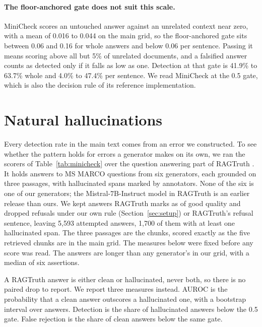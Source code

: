 \documentclass[11pt]{article}
\begin{document}
\paragraph{The floor-anchored gate does not suit this scale.} MiniCheck scores an untouched answer against an unrelated context near zero, with a mean of 0.016 to 0.044 on the main grid, so the floor-anchored gate sits between 0.06 and 0.16 for whole answers and below 0.06 per sentence. Passing it means scoring above all but 5\% of unrelated documents, and a falsified answer counts as detected only if it falls as low as one. Detection at that gate is 41.9\% to 63.7\% whole and 4.0\% to 47.4\% per sentence. We read MiniCheck at the 0.5 gate, which is also the decision rule of its reference implementation.

\section{Natural hallucinations}
\label{app:ragtruth}

Every detection rate in the main text comes from an error we constructed. To see whether the pattern holds for errors a generator makes on its own, we ran the scorers of Table~\ref{tab:minicheck} over the question answering part of RAGTruth \citep{niu-etal-2024}. It holds answers to MS MARCO questions from six generators, each grounded on three passages, with hallucinated spans marked by annotators. None of the six is one of our generators; the Mistral-7B-Instruct model in RAGTruth is an earlier release than ours. We kept answers RAGTruth marks as of good quality and dropped refusals under our own rule (Section~\ref{sec:setup}) or RAGTruth's refusal sentence, leaving 5,593 attempted answers, 1,700 of them with at least one hallucinated span. The three passages are the chunks, scored exactly as the five retrieved chunks are in the main grid. The measures below were fixed before any score was read. The answers are longer than any generator's in our grid, with a median of six assertions.

A RAGTruth answer is either clean or hallucinated, never both, so there is no paired drop to report. We report three measures instead. AUROC is the probability that a clean answer outscores a hallucinated one, with a bootstrap interval over answers. Detection is the share of hallucinated answers below the 0.5 gate. False rejection is the share of clean answers below the same gate.
\end{document}
